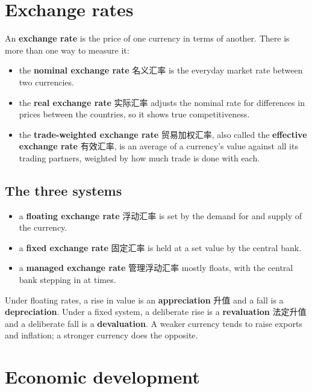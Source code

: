 \documentclass[11pt]{article}
\begin{document}
\section*{Exchange rates}

An \textbf{exchange rate} is the price of one currency in terms of another. There is more than one way to measure it:

\begin{itemize}
\item the \textbf{nominal exchange rate} 名义汇率 is the everyday market rate between two currencies.

\item the \textbf{real exchange rate} 实际汇率 adjusts the nominal rate for differences in prices between the countries, so it shows true competitiveness.

\item the \textbf{trade-weighted exchange rate} 贸易加权汇率, also called the \textbf{effective exchange rate} 有效汇率, is an average of a currency's value against all its trading partners, weighted by how much trade is done with each.

\end{itemize}

\subsection*{The three systems}

\begin{itemize}
\item a \textbf{floating exchange rate} 浮动汇率 is set by the demand for and supply of the currency.

\item a \textbf{fixed exchange rate} 固定汇率 is held at a set value by the central bank.

\item a \textbf{managed exchange rate} 管理浮动汇率 mostly floats, with the central bank stepping in at times.

\end{itemize}

Under floating rates, a rise in value is an \textbf{appreciation} 升值 and a fall is a \textbf{depreciation}. Under a fixed system, a deliberate rise is a \textbf{revaluation} 法定升值 and a deliberate fall is a \textbf{devaluation}. A weaker currency tends to raise exports and inflation; a stronger currency does the opposite.

\section*{Economic development}
\end{document}

